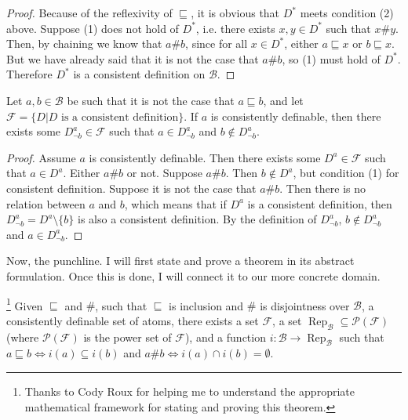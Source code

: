 \documentclass[12pt]{amsart}
\DeclareMathOperator{\Rep}{Rep}
\begin{document}
\begin{proof}
Because of the reflexivity of $\sqsubseteq $, it is obvious that  $D^*$ meets condition (2) above. Suppose (1) does not hold of $D^*$, i.e. there exists $x,y\in D^*$ such that $x\#y$. Then, by chaining we know that $a\#b$, since for all $x\in D^*$, either $a\sqsubseteq x$ or $b\sqsubseteq x$. But we have already said that it is not the case that $a\#b$, so (1) must hold of $D^*$. Therefore $D^*$ is a consistent definition on $\mathcal{B}$.
\end{proof}
\par\vspace{3mm}
Let $a,b\in\mathcal{B}$ be such that it is not the case that $a\sqsubseteq b$, and let $\mathcal{F}=\{D\vert D\text{ is a consistent definition}\}$. If $a$ is consistently definable, then there exists some $D_{\lnot b}^a\in\mathcal{F}$ such that $a\in D_{\lnot b}^a$ and $b\notin D_{\lnot b}^a$.

\begin{proof}
Assume $a$ is consistently definable. Then there exists some $D^a\in\mathcal{F}$ such that $a\in D^a$. Either $a\# b$ or not. Suppose $a\#b$. Then $b\notin D^a$, but condition (1) for consistent definition. Suppose it is not the case that $a\#b$. Then there is no relation between $a$ and $b$, which means that if $D^a$ is a consistent definition, then $D_{\lnot b}^a=D^a\setminus\{b\}$ is also a consistent definition. By the definition of $D_{\lnot b}^a$, $b\notin D_{\lnot b}^a$ and $a\in D_{\lnot b}^a$.
\end{proof}

Now, the punchline. I will first state and prove a theorem in its abstract formulation. Once this is done, I will connect it to our more concrete domain.
\par\vspace{3mm}
\footnote{Thanks to Cody Roux for helping me to understand the appropriate mathematical framework for stating and proving this theorem.} Given $\sqsubseteq $ and $\#$,  such that $\sqsubseteq $ is inclusion and $\#$ is disjointness over $\mathcal{B}$, a consistently definable set of atoms, there exists a set $\mathcal{F}$, a set $\Rep_\mathcal{B}\subseteq\mathcal{P}(\mathcal{F})$ (where $\mathcal{P}(\mathcal{F})$ is the power set of $\mathcal{F}$), and a function $i:\mathcal{B}\rightarrow\Rep_\mathcal{B}$ such that $a\sqsubseteq b\Leftrightarrow i(a)\subseteq i(b)$  and $a\#b\Leftrightarrow i(a)\cap i(b)=\emptyset$.
\end{document}
